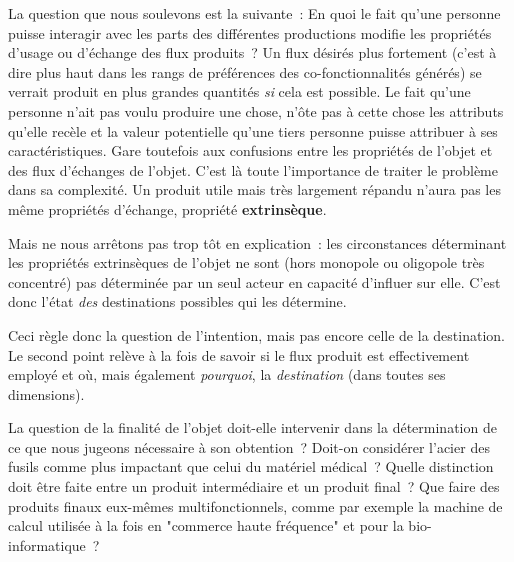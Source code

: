La question que nous soulevons est la suivante~: En quoi le fait qu'une personne puisse interagir avec les parts des différentes productions modifie les propriétés d'usage ou d'échange des flux produits~?
Un flux désirés plus fortement (c'est à dire plus haut dans les rangs de préférences des co-fonctionnalités générés) se verrait produit en plus grandes quantités \emph{si} cela est possible.
Le fait qu'une personne n'ait pas voulu produire une chose, n'ôte pas à cette chose les attributs qu'elle recèle et la valeur potentielle qu'une tiers personne puisse attribuer à ses caractéristiques.
Gare toutefois aux confusions entre les propriétés de l'objet et des flux d'échanges de l'objet.
C'est là toute l'importance de traiter le problème dans sa complexité.
Un produit utile mais très largement répandu n'aura pas les même propriétés d'échange, propriété \textbf{extrinsèque}.

Mais ne nous arrêtons pas trop tôt en explication~: les circonstances déterminant les propriétés extrinsèques de l'objet ne sont (hors monopole ou oligopole très concentré) pas déterminée par un seul acteur en capacité d'influer sur elle.
C'est donc l'état \emph{des} destinations possibles qui les détermine.

Ceci règle donc la question de l'intention, mais pas encore celle de la destination.
Le second point relève à la fois de savoir si le flux produit est effectivement employé et où, mais également \emph{pourquoi}, la \emph{destination} (dans toutes ses dimensions).

La question de la finalité de l'objet doit-elle intervenir dans la détermination de ce que nous jugeons nécessaire à son obtention~?
Doit-on considérer l'acier des fusils comme plus impactant que celui du matériel médical~?
Quelle distinction doit être faite entre un produit intermédiaire et un produit final~?
Que faire des produits finaux eux-mêmes multifonctionnels, comme par exemple la machine de calcul utilisée à la fois en "commerce haute fréquence" et pour la bio-informatique~?

